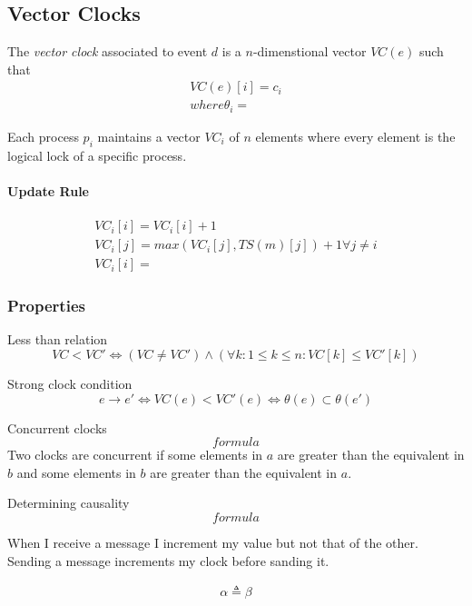 \documentclass{article}
\begin{document}
\subsection{Vector Clocks}
The \textit{vector clock} associated to event $d$ is a $n$-dimenstional vector $VC(e)$ such that
\begin{align*}
VC(e)[i] = c_i \\
where \theta_i = 
\end{align*}

Each process $p_i$ maintains a vector $VC_i$ of $n$ elements where every element is the logical lock of a specific process. 

\paragraph{Update Rule}
\begin{gather*}
VC_i[i] = VC_i[i]+1 \\
VC_i[j] = max(VC_i[j], TS(m)[j])+1 \forall j\neq i \\
VC_i[i] = 
\end{gather*}

\subsubsection{Properties}
Less than relation 
$$VC < VC' \iff (VC\neq VC') \wedge (\forall k:1\leq k \leq n: VC[k]\leq VC'[k])$$

Strong clock condition
$$e\to e' \iff VC(e) < VC'(e) \iff \theta(e) \subset \theta(e')$$

Concurrent clocks
$$formula$$
Two clocks are concurrent if some elements in $a$ are greater than the equivalent in $b$ and some elements in $b$ are greater than the equivalent in $a$.

Determining causality
$$formula$$

\begin{callout}{}
    When I receive a message I increment my value but not that of the other.\\
    Sending a message increments my clock before sanding it.\\
\end{callout}

\begin{callout}{}
    \begin{align*}
        \alpha \triangleq \beta
    \end{align*}
\end{callout}
\end{document}
